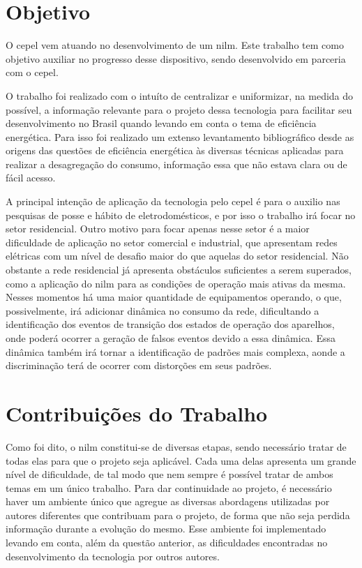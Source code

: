 \section{Objetivo}

O \acs{cepel} vem atuando no desenvolvimento de um \acs{nilm}. Este
trabalho tem como objetivo auxiliar no progresso desse dispositivo,
sendo desenvolvido em parceria com o \acs{cepel}.

O trabalho foi realizado com o intuíto de centralizar e uniformizar,
na medida do possível, a informação relevante para o projeto dessa
tecnologia para facilitar seu desenvolvimento no Brasil quando levando
em conta o tema de eficiência energética. Para isso foi realizado um
extenso levantamento bibliográfico desde as origens das questões de
eficiência energética às diversas técnicas aplicadas para realizar a
desagregação do consumo, informação essa que não estava clara ou de
fácil acesso.

A principal intenção de aplicação da tecnologia pelo \acs{cepel} é
para o auxilio nas pesquisas de posse e hábito de eletrodomésticos, e
por isso o trabalho irá focar no setor residencial. Outro motivo para
focar apenas nesse setor é a maior dificuldade de aplicação no setor
comercial e industrial, que apresentam redes elétricas com um nível de
desafio maior do que aquelas do setor residencial. Não obstante a rede
residencial já apresenta obstáculos suficientes a serem superados,
como a aplicação do \acs{nilm} para as condições de operação mais
ativas da mesma. Nesses momentos há uma maior quantidade de
equipamentos operando, o que, possivelmente, irá adicionar dinâmica no
consumo da rede, dificultando a identificação dos eventos de transição
dos estados de operação dos aparelhos, onde poderá ocorrer a geração
de falsos eventos devido a essa dinâmica. Essa dinâmica também irá
tornar a identificação de padrões mais complexa, aonde a discriminação
terá de ocorrer com distorções em seus padrões.

\section{Contribuições do Trabalho}

Como foi dito, o \acs{nilm} constitui-se de diversas etapas, sendo
necessário tratar de todas elas para que o projeto seja aplicável.
Cada uma delas apresenta um grande nível de dificuldade, de tal modo
que nem sempre é possível tratar de ambos temas em um único trabalho.
Para dar continuidade ao projeto, é necessário haver um ambiente
único que agregue as diversas abordagens utilizadas por autores
diferentes que contribuam para o projeto, de forma que não
seja perdida informação durante a evolução do mesmo. Esse ambiente
foi implementado levando em conta, além da questão anterior, as
dificuldades encontradas no desenvolvimento da tecnologia por outros
autores.

